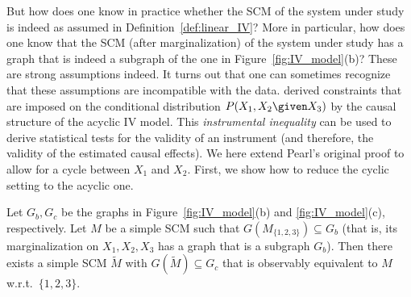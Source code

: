 But how does one know in practice whether the SCM of the system under study is indeed as assumed in Definition~\ref{def:linear_IV}?
More in particular, how does one know that the SCM (after marginalization) of the system under study has a graph that is indeed a subgraph of the one in Figure~\ref{fig:IV_model}(b)? 
These are strong assumptions indeed.
It turns out that one can sometimes recognize that these assumptions are incompatible with the data.
\cite{Pearl1995} derived constraints that are imposed on the conditional distribution $P(X_1,X_2 \given X_3)$ by the causal structure of the acyclic IV model. 
This \emph{instrumental inequality} can be used to derive statistical tests for the validity of an instrument (and therefore, the validity of the estimated causal effects).
We here extend Pearl's original proof to allow for a cycle between $X_1$ and $X_2$.
First, we show how to reduce the cyclic setting to the acyclic one.
\begin{Lem}\label{lem:cyclic_IV_model}
  Let $G_b, G_c$ be the graphs in Figure~\ref{fig:IV_model}(b) and \ref{fig:IV_model}(c), respectively.
  Let $M$ be a simple SCM such that $G(M_{\{1,2,3\}}) \subseteq G_b$ (that is, its marginalization on $X_1, X_2, X_3$ has a graph that is a subgraph $G_b$). 
  Then there exists a simple SCM $\tilde{M}$ with $G(\tilde{M}) \subseteq G_c$ that is observably equivalent to $M$ w.r.t.\ $\{1,2,3\}$.
\end{Lem}
